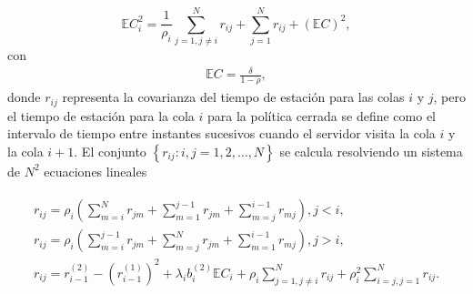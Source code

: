 \documentclass{article}
\newcommand{\esp}{\mathbb{E}}
\numberwithin{equation}{section}
\begin{document}
\begin{equation}\label{Eq.Periodo.Intervisita.Gated}
\esp C_{i}^{2}=\frac{1}{\rho_{i}}\sum_{j=1,j\neq
i}^{N}r_{ij}+\sum_{j=1}^{N}r_{ij}+\left(\esp C\right)^{2},
\end{equation}
con
\begin{eqnarray*}
\esp C=\frac{\delta}{1-\rho},
\end{eqnarray*}
donde $r_{ij}$ representa la covarianza del tiempo de estaci\'on para las colas $i$ y $j$, pero el tiempo de estaci\'on para la cola $i$ para la pol\'itica cerrada se define como el intervalo de tiempo entre instantes sucesivos cuando el servidor visita la cola $i$ y la cola $i+1$. El conjunto $\left\{r_{ij}:i,j=1,2,\ldots,N\right\}$ se calcula resolviendo un
sistema de $N^{2}$ ecuaciones lineales

\begin{eqnarray}\label{Eq.Cov.TT.Gated}
\begin{array}{l}
r_{ij}=\rho_{i}\left(\sum_{m=i}^{N}r_{jm}+\sum_{m=1}^{j-1}r_{jm}+\sum_{m=j}^{i-1}r_{mj}\right),\textrm{
}j<i,\\
r_{ij}=\rho_{i}\left(\sum_{m=i}^{j-1}r_{jm}+\sum_{m=j}^{N}r_{jm}+\sum_{m=1}^{i-1}r_{mj}\right),\textrm{
}j>i,\\
r_{ij}=r_{i-1}^{(2)}-\left(r_{i-1}^{(1)}\right)^{2}+\lambda_{i}b_{i}^{(2)}\esp
C_{i}+\rho_{i}\sum_{j=1,j\neq
i}^{N}r_{ij}+\rho_{i}^{2}\sum_{i=j,j=1}^{N}r_{ij}.
\end{array}
\end{eqnarray}
\end{document}
